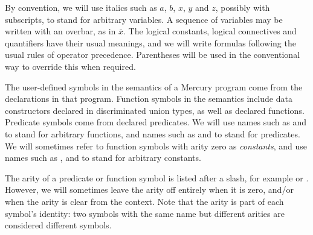 By convention,
we will use italics such as $a$, $b$, $x$, $y$ and $z$,
possibly with subscripts,
to stand for arbitrary variables.
A sequence of variables may be written with an overbar,
as in $\bar{x}$.
The logical constants, logical connectives and quantifiers
have their usual meanings,
and we will write formulas following
the usual rules of operator precedence.
Parentheses will be used in the conventional way
to override this when required.

The user-defined symbols in the semantics of a Mercury program
come from the declarations in that program.
Function symbols in the semantics include
data constructors declared in discriminated union types,
as well as declared functions.
Predicate symbols come from declared predicates.
We will use names such as  and  to stand for arbitrary functions,
and names such as  and  to stand for predicates.
We will sometimes refer to function symbols with arity zero
as \emph{constants\label{gi:constant}},
and use names such as ,  and 
to stand for arbitrary constants.

The arity of a predicate or function symbol
is listed after a slash, for example  or .
However,
we will sometimes leave the arity off entirely
when it is zero, and/or when the arity is clear from the context.
Note that the arity is part of each symbol's identity:
two symbols with the same name but different arities
are considered different symbols.

